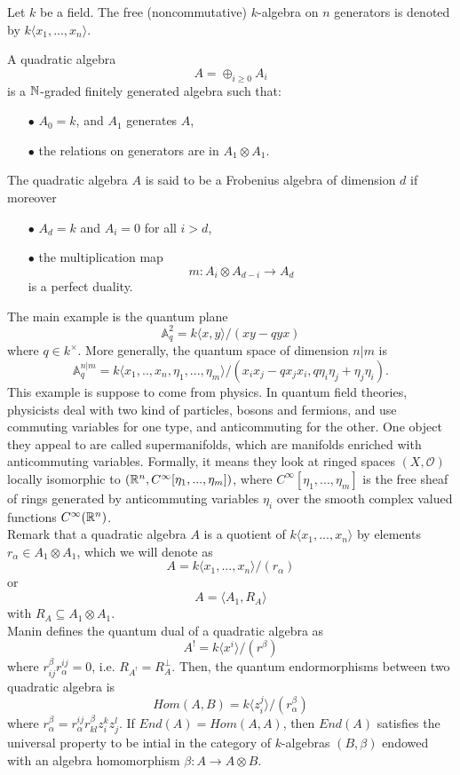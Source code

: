 Let $k$ be a field. The free (noncommutative) $k$-algebra on $n$ generators is denoted by $k\langle x_1,... ,x_n\rangle$.

\begin{definition}
A quadratic algebra 
\[A= \oplus_{i\geq 0} A_i\] 
is a $\mathbb N$-graded finitely generated algebra such that:
\begin{itemize}
\item[$\bullet$] $A_0 = k$, and $A_1$ generates $A$,
\item[$\bullet$] the relations on generators are in $A_1 \otimes A_1$. 
\end{itemize} 
The quadratic algebra $A$ is said to be a Frobenius algebra of dimension $d$ if moreover 
\begin{itemize}
\item[$\bullet$] $A_d= k$ and $A_i =0$ for all $i>d$,
\item[$\bullet$] the multiplication map
\[m : A_i \otimes A_{d-i} \rightarrow A_d\]
is a perfect duality.
\end{itemize}
\end{definition}

The main example is the quantum plane
\[\mathbb A_q^{2} = k\langle x,y \rangle / (xy -qyx)\]
where $q\in k^\times$. More generally, the quantum space of dimension $n|m$ is
\[ \mathbb A_q^{n|m} = k\langle x_1,.. ,x_n , \eta_1,...,\eta_m \rangle / (x_i x_j - q x_j x_i , q \eta_i \eta_j +  \eta_j \eta_i).\]
This example is suppose to come from physics. In quantum field theories, physicists deal with two kind of particles, bosons and fermions, and use commuting variables for one type, and anticommuting for the other. One object they appeal to are called supermanifolds, which are manifolds enriched with anticommuting variables. Formally, it means they look at ringed spaces $(X,\mathcal O)$ locally isomorphic to $(\mathbb R^n, C^\infty [\eta_1,...,\eta_m])$, where $C^\infty [\eta_1,...,\eta_m]$ is the free sheaf of rings generated by anticommuting variables $\eta_i$ over the smooth complex valued functions $C^\infty(\mathbb R^n)$.\\

Remark that a quadratic algebra $A$ is a quotient of $k\langle x_1,... ,x_n\rangle$ by elements $r_\alpha \in A_1 \otimes A_1$, which we will denote as 
\[A= k\langle x_1,... ,x_n\rangle / (r_\alpha)\]
or \[A= \langle A_1, R_A\rangle\]
with $R_A \subseteq A_1 \otimes A_1$.\\

Manin defines the quantum dual of a quadratic algebra as
\[A^{!} = k\langle x^i\rangle / (r^\beta)\]
where $r^\beta_{ij}r^{ij}_\alpha = 0$, i.e. $R_{A^!}=R_{A}^\perp$. Then, the quantum endormorphisms between two quadratic algebra is
\[Hom(A,B) =k\langle z^j_i\rangle / (r_\alpha^\beta)\]
where $r_\alpha^\beta = r_\alpha^{ij}r^\beta_{kl} z_i^k z_j^l$. If $End(A)= Hom(A,A)$, then $End(A)$ satisfies the universal property to be intial in the category of $k$-algebras $(B,\beta)$ endowed with an algebra homomorphism $\beta: A \rightarrow A\otimes B$.\\ 

